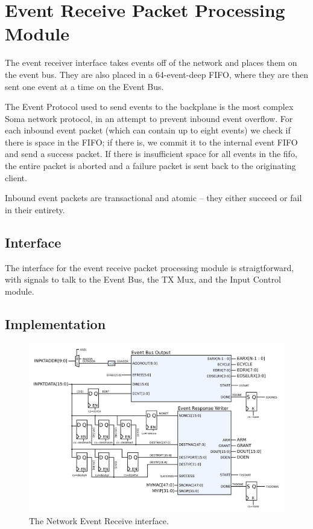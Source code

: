 \section{Event Receive Packet Processing Module}

The event receiver interface takes events off of the network and
places them on the event bus. They are also placed in a 64-event-deep
FIFO, where they are then sent one event at a time on the Event Bus.

The Event Protocol used to send events to the backplane is the most
complex Soma network protocol, in an attempt to prevent inbound event
overflow. For each inbound event packet (which can contain up to eight
events) we check if there is space in the FIFO; if there is, we commit
it to the internal event FIFO and send a success packet. If there is
insufficient space for all events in the fifo, the entire packet is
aborted and a failure packet is sent back to the originating client.

Inbound event packets are transactional and atomic -- they either
succeed or fail in their entirety.

\subsection{Interface}
The interface for the event receive packet processing module is
straigtforward, with signals to talk to the Event Bus, the TX Mux, and
the Input Control module.

\subsection{Implementation}

\begin{figure}
\begin{centering}
\includegraphics[scale=0.8]{eventreceive.svg}
\end{centering}
\caption{The Network Event Receive interface.}
\label{eventreceive}
\end{figure}

